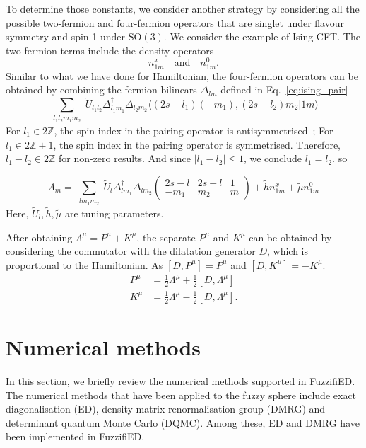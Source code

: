 \documentclass{timesjhep}
\begin{document}
To determine those constants, we consider another strategy by considering all the possible two-fermion and four-fermion operators that are singlet under flavour symmetry and spin-1 under $\mathrm{SO}(3)$. We consider the example of Ising CFT. The two-fermion terms include the density operators 
\begin{equation*}
    n^x_{1m}\quad\textrm{and}\quad n^0_{1m}.
\end{equation*}
Similar to what we have done for Hamiltonian, the four-fermion operators can be obtained by combining the fermion bilinears $\Delta_{lm}$ defined in Eq.~\eqref{eq:ising_pair}
\begin{equation}
    \sum_{\substack{l_1l_2m_1m_2}}\tilde{U}_{l_1l_2}\Delta^\dagger_{l_1m_1}\Delta_{l_2m_2}\langle (2s-l_1)(-m_1),(2s-l_2)m_2|1m\rangle
\end{equation} 
For $l_1\in2\mathbb{Z}$, the spin index in the pairing operator is antisymmetrised~; For $l_1\in2\mathbb{Z}+1$, the spin index in the pairing operator is symmetrised. Therefore, $l_1-l_2\in2\mathbb{Z}$ for non-zero results. And since $|l_1-l_2|\leq 1$, we conclude $l_1=l_2$. so 

\begin{equation}
    \Lambda_m=\sum_{\substack{lm_1m_2}}\tilde{U}_{l}\Delta^\dagger_{lm_1}\Delta_{lm_2}\begin{pmatrix}2s-l&2s-l&1\\-m_1&m_2&m     \end{pmatrix}+\tilde{h}n^x_{1m}+\tilde{\mu}n^0_{1m} 
\end{equation}
Here, $\tilde{U}_l,\tilde{h},\tilde{\mu}$ are tuning parameters. 

After obtaining $\Lambda^\mu=P^\mu+K^\mu$, the separate $P^\mu$ and $K^\mu$ can be obtained by considering the commutator with the dilatation generator $D$, which is proportional to the Hamiltonian. As $[D,P^\mu]=P^\mu$ and $[D,K^\mu]=-K^\mu$.
\begin{align}
    P^\mu&=\tfrac{1}{2}\Lambda^\mu+\tfrac{1}{2}[D,\Lambda^\mu]\nonumber\\
    K^\mu&=\tfrac{1}{2}\Lambda^\mu-\tfrac{1}{2}[D,\Lambda^\mu].
\end{align} 

\section{Numerical methods}
\label{sec:numerics}

In this section, we briefly review the numerical methods supported in FuzzifiED. The numerical methods that have been applied to the fuzzy sphere include exact diagonalisation (ED), density matrix renormalisation group (DMRG) and determinant quantum Monte Carlo (DQMC). Among these, ED and DMRG have been implemented in FuzzifiED. 
\end{document}
